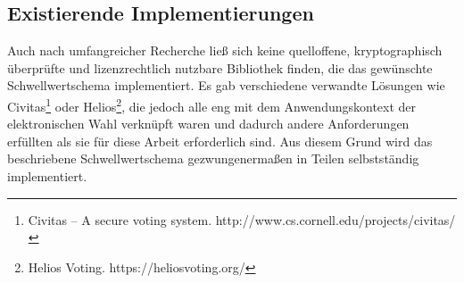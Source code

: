 \subsection{Existierende Implementierungen}

\label{sec_state_threshold_existing_impl}

Auch nach umfangreicher Recherche ließ sich keine quelloffene, kryptographisch überprüfte und lizenzrechtlich nutzbare Bibliothek finden, die das gewünschte Schwellwertschema implementiert. Es gab verschiedene verwandte Lösungen wie Civitas\footnote{
  Civitas -- A secure voting system. http://www.cs.cornell.edu/projects/civitas/
} oder Helios\footnote{
  Helios Voting. https://heliosvoting.org/
}, die jedoch alle eng mit dem Anwendungskontext der elektronischen Wahl verknüpft waren und dadurch andere Anforderungen erfüllten als sie für diese Arbeit erforderlich sind. Aus diesem Grund wird das beschriebene Schwellwertschema gezwungenermaßen in Teilen selbstständig implementiert.